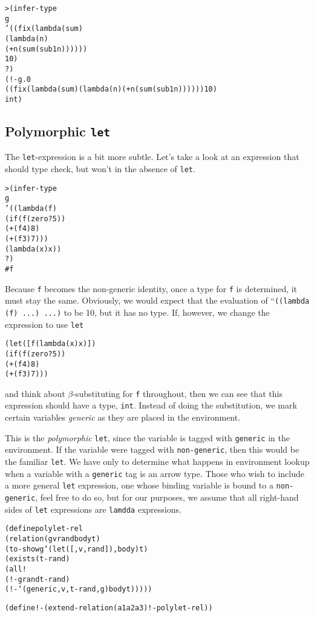 \begin{alltt}
> (infer-type
    g
    '((fix (lambda (sum)
             (lambda (n)
               (+ n (sum (sub1 n))))))
      10)
    ?)
(!- g.0
    ((fix (lambda (sum) (lambda (n) (+ n (sum (sub1 n)))))) 10)
    int)
\end{alltt}

\subsection{Polymorphic \texttt{let}}

The \texttt{let}-expression is a bit more subtle.  Let's take a look at
an expression that should type check, but won't in the absence of
\texttt{let}.

\begin{alltt}
> (infer-type
    g
    '((lambda (f)
        (if (f (zero? 5))
          (+ (f 4) 8)
          (+ (f 3) 7)))
      (lambda (x) x))
    ?)
#f
\end{alltt}

Because \texttt{f} becomes the non-generic identity, once a type for
\texttt{f} is determined, it must stay the same.  Obviously, we would
expect that the evaluation of ``\texttt{((lambda (f) ...) ...)}
to be 10, but it has no type.  If, however, we change the
expression to use \texttt{let}
\begin{alltt}
(let ([f (lambda (x) x)])
  (if (f (zero? 5))
    (+ (f 4) 8)
    (+ (f 3) 7)))
\end{alltt}

\noindent
and think about $\beta$-substituting for \texttt{f} throughout, then
we can see that this expression should have a type, \texttt{int}.
Instead of doing the substitution, we mark certain variables
\emph{generic} as they are placed in the environment.

This is the \emph{polymorphic} \texttt{let}, since the variable is
tagged with \texttt{generic} in the environment.  If the variable were
tagged with \texttt{non-generic}, then this would be the familiar
\texttt{let}.  We have only to determine what happens in environment
lookup when a variable with a \texttt{generic} tag is an arrow type.
Those who wish to include a more general \texttt{let} expression, one
whose binding variable is bound to a \texttt{non-generic}, feel free
to do so, but for our purposes, we assume that all right-hand sides of
\texttt{let} expressions are \texttt{lamdda} expressions.

\begin{alltt}
(define polylet-rel
  (relation (g v rand body t)
    (to-show g `(let ([,v ,rand]) ,body) t)
    (exists (t-rand)
      (all!
        (!- g rand t-rand)
        (!- `(generic ,v ,t-rand ,g) body t)))))

(define !- (extend-relation (a1 a2 a3) !- polylet-rel))
\end{alltt}

